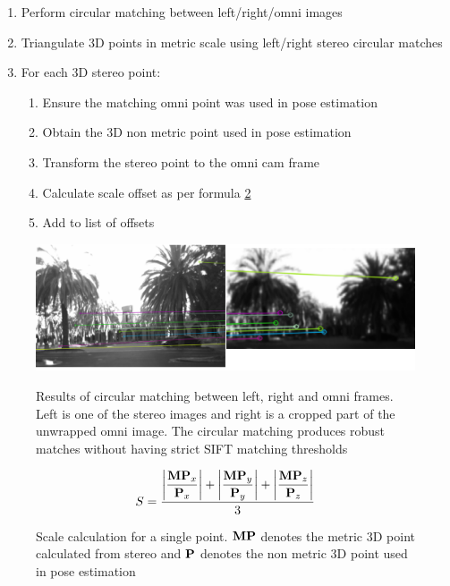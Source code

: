 \begin{enumerate}
\itemsep0em
 \item Perform circular matching between left/right/omni images %
 \item Triangulate 3D points in metric scale using left/right stereo circular matches
 \item For each 3D stereo point:
 \begin{enumerate}
   \item Ensure the matching omni point was used in pose estimation
   \item Obtain the 3D non metric point used in pose estimation
   \item Transform the stereo point to the omni cam frame %
   \item Calculate scale offset as per formula \ref{eq:scale_offset} %
   \item Add to list of offsets 
 \end{enumerate}
\end{enumerate}

\begin{figure}[H]
  \centering
    \includegraphics[width=1.0\textwidth]{chapters/images/circular_match}\\
  \caption{Results of circular matching between left, right and omni frames. Left is one of the stereo images and right is a cropped part of the unwrapped omni image. The circular matching produces robust matches without having strict SIFT matching thresholds}
  \label{fig:circular_match}
\end{figure}

\begin{figure}[h]
  \centering
  \begin{align}
   S =
   \displaystyle\frac{
   \left|\displaystyle\frac{\mathbf {MP}_{x}}{\mathbf P_{x}}\right| + 
   \left|\displaystyle\frac{\mathbf {MP}_{y}}{\mathbf P_{y}}\right| + 
   \left|\displaystyle\frac{\mathbf {MP}_{z}}{\mathbf P_{z}}\right|
   }
   {3}
  \end{align}
  \caption{Scale calculation for a single point.  $\mathbf{MP}$ denotes the metric 3D point calculated from stereo and $\mathbf{P}$ denotes the non metric 3D point used in pose estimation}
  \label{eq:scale_offset}
\end{figure}

